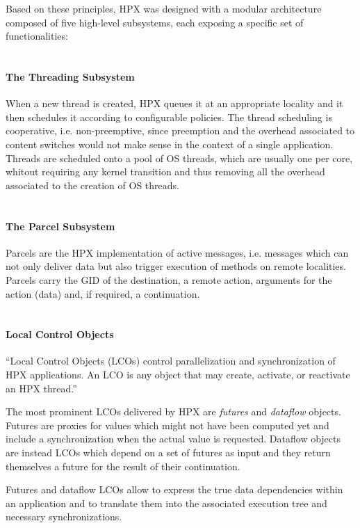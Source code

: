 Based on these principles, HPX was designed with a modular architecture composed of five high-level subsystems, each exposing a specific set of functionalities:
~\\~

\paragraph{The Threading Subsystem}
When a new thread is created, HPX queues it at an appropriate locality and it then schedules it according to configurable policies. The thread scheduling is cooperative, i.e. non-preemptive, since preemption and the overhead associated to content switches would not make sense in the context of a single application. Threads are scheduled onto a pool of OS threads, which are usually one per core, whitout requiring any kernel transition and thus removing all the overhead associated to the creation of OS threads.
~\\~

\paragraph{The Parcel Subsystem}
Parcels are the HPX implementation of active messages, i.e. messages which can not only deliver data but also trigger execution of methods on remote localities.
Parcels carry the GID of the destination, a remote action, arguments for the action (data) and, if required, a continuation.
~\\~

\paragraph{Local Control Objects}
``Local Control Objects (LCOs) control parallelization and synchronization of
HPX applications. An LCO is any object that may create, activate, or reactivate
an HPX thread.''\cite{grubel2016dynamic}

The most prominent LCOs delivered by HPX are \emph{futures} and \emph{dataflow} objects. Futures are proxies for values which might not have been computed yet and include a synchronization when the actual value is requested. Dataflow objects are instead LCOs which depend on a set of futures as input and they return themselves a future for the result of their continuation.

Futures and dataflow LCOs allow to express the true data dependencies within an application and to translate them into the associated execution tree and necessary synchronizations.
~\\~

